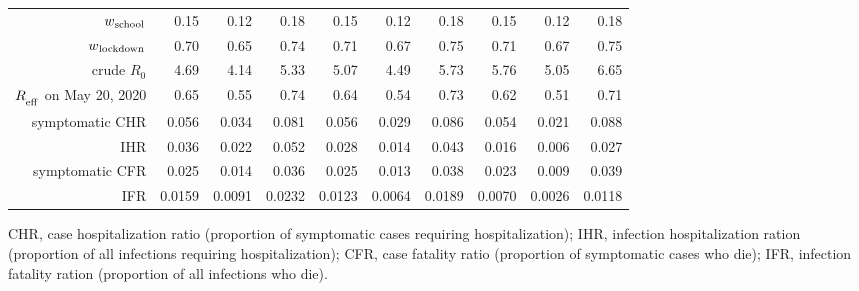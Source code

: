 \documentclass[11pt]{article}
\begin{document}
\begin{table}[!htb]
\begin{tabular}{r|rrr|rrr|rrr}
			$w\textsubscript{school}$ & 0.15 & 0.12 & 0.18 & 0.15 & 0.12 & 0.18 & 0.15 & 0.12 & 0.18 \\ 
			$w\textsubscript{lockdown}$ & 0.70 & 0.65 & 0.74 & 0.71 & 0.67 & 0.75 & 0.71 & 0.67 & 0.75 \\ 
			crude $R_0$ & 4.69 & 4.14 & 5.33 & 5.07 & 4.49 & 5.73 & 5.76 & 5.05 & 6.65 \\ 
			$R_\textsubscript{eff}$ on May 20, 2020 & 0.65 & 0.55 & 0.74 & 0.64 & 0.54 & 0.73 & 0.62 & 0.51 & 0.71 \\ 
			symptomatic CHR & 0.056 & 0.034 & 0.081 & 0.056 & 0.029 & 0.086 & 0.054 & 0.021 & 0.088 \\ 
			IHR & 0.036 & 0.022 & 0.052 & 0.028 & 0.014 & 0.043 & 0.016 & 0.006 & 0.027 \\ 
			symptomatic CFR & 0.025 & 0.014 & 0.036 & 0.025 & 0.013 & 0.038 & 0.023 & 0.009 & 0.039 \\ 
			IFR & 0.0159 & 0.0091 & 0.0232 & 0.0123 & 0.0064 & 0.0189 & 0.0070 & 0.0026 & 0.0118 \\ 
		\bottomrule 
	\end{tabular}
	\vspace{0.5em}
	
	{\raggedright CHR, case hospitalization ratio (proportion of symptomatic cases requiring hospitalization); IHR, infection hospitalization ration (proportion of all infections requiring hospitalization);
		          CFR, case fatality ratio (proportion of symptomatic cases who die); IFR, infection fatality ration (proportion of all infections who die). \par}
	\label{tbl:posterior}
\end{table}


\end{document}
